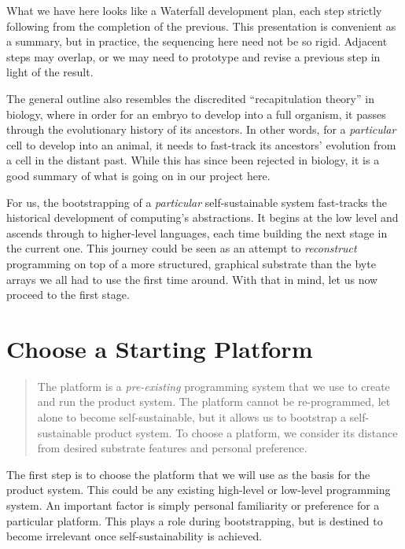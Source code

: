 \documentclass[ twoside,openright,titlepage,numbers=noenddot,headinclude,footinclude,cleardoublepage=empty,abstract=on,
                BCOR=5mm,paper=a4,fontsize=11pt
                ]{scrreprt}
\newcommand{\tomas}[1]{}
\theoremstyle{definition}
\begin{document}
What we have here looks like a Waterfall development plan, each step
strictly following from the completion of the previous. This
presentation is convenient as a summary, but in practice, the sequencing
here need not be so rigid. Adjacent steps may overlap, or we may need to
prototype and revise a previous step in light of the result.

The general outline also resembles the discredited ``recapitulation
theory'' in biology, where in order for an embryo to develop into a full
organism, it passes through the evolutionary history of its ancestors.
In other words, for a \emph{particular} cell to develop into an animal,
it needs to fast-track its ancestors' evolution from a cell in the
distant past. While this has since been rejected in biology, it is a
good summary of what is going on in our project here.

For us, the bootstrapping of a \emph{particular} self-sustainable system
fast-tracks the historical development of computing's abstractions. It
begins at the low level and ascends through to higher-level languages,
each time building the next stage in the current one. This journey could
be seen as an attempt to \emph{reconstruct} programming on top of a more
structured, graphical substrate than the byte arrays we all had to use
the first time around. With that in mind, let us now proceed to the
first stage.

\hypertarget{choose-a-starting-platform}{\section{Choose a Starting Platform}\label{choose-a-starting-platform}}

\begin{quote}
The platform is a \emph{pre-existing} programming system that we use to
create and run the product system. The platform cannot be re-programmed,
let alone to become self-sustainable, but it allows us to bootstrap a
self-sustainable product system. To choose a platform, we consider its
distance from desired substrate features and personal preference.
\end{quote}

\tomas{I removed the "blank slate" phrase here, because the platform is not a blank slate at all (maybe - it is the "slate" itself? which is of course not blank because it is granite!)}

The first step is to choose the platform that we will use as the basis
for the product system. This could be any existing high-level or
low-level programming system. An important factor is simply personal
familiarity or preference for a particular platform. This plays a role
during bootstrapping, but is destined to become irrelevant once
self-sustainability is achieved.
\end{document}
